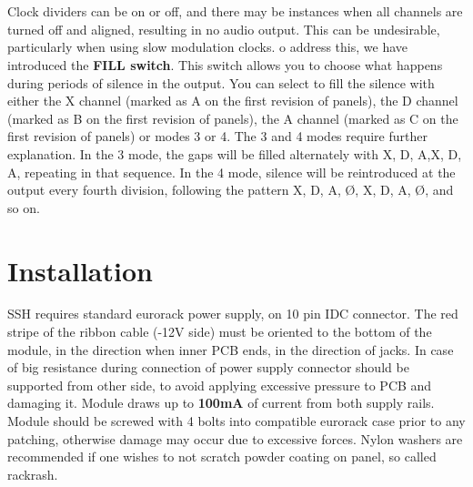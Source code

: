 \documentclass[a4paper,14pt]{extarticle}
\newlength\myboxwidth
\begin{document}
\vspace{0.5cm}
\\
\vspace{0.5cm}
\\
Clock dividers can be on or off, and there may be instances when all channels are turned off and aligned, resulting in no audio output. This can be undesirable, particularly when using slow modulation clocks.  o address this, we have introduced the \textbf{FILL switch}. This switch allows you to choose what happens during periods of silence in the output. You can select to fill the silence with either the X channel (marked as A on the first revision of panels), the D channel (marked as B on the first revision of panels),  the A channel (marked as C on the first revision of panels) or modes 3 or 4. The 3 and 4 modes require further explanation. In the 3 mode, the gaps will be filled alternately with \textcolor{Xcolor}{X}, \textcolor{Dcolor}{D}, \textcolor{Acolor}{A},\textcolor{Xcolor}{X}, \textcolor{Dcolor}{D}, \textcolor{Acolor}{A}, repeating in that sequence. In the 4 mode, silence will be reintroduced at the output every fourth division, following the pattern \textcolor{Xcolor}{X}, \textcolor{Dcolor}{D}, \textcolor{Acolor}{A}, Ø, \textcolor{Xcolor}{X}, \textcolor{Dcolor}{D}, \textcolor{Acolor}{A}, Ø, and so on.

\section*{Installation}
SSH requires standard eurorack power supply, on 10 pin IDC connector. The red stripe of the ribbon cable (-12V side) must be oriented to the bottom of the module, in the direction when inner PCB ends, in the direction of jacks. In case of big resistance during connection of power supply connector should
be supported from other side, to avoid applying excessive pressure to PCB and damaging it. Module draws up to \textbf{100mA} of current from both supply rails. Module should be screwed with 4 bolts into compatible eurorack case prior to any patching, otherwise damage may occur due to excessive forces. Nylon washers are recommended if one wishes to not scratch powder coating on panel, so called rackrash.
\\
\end{document}
